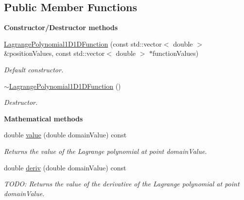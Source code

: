 \subsection*{Public Member Functions}
\begin{Indent}{\bf Constructor/\-Destructor methods}\par
\begin{DoxyCompactItemize}
\item 
\hyperlink{class_q_u_e_s_o_1_1_lagrange_polynomial1_d1_d_function_ab8678ebfde2a4b2ca59741673eeaf103}{Lagrange\-Polynomial1\-D1\-D\-Function} (const std\-::vector$<$ double $>$ \&position\-Values, const std\-::vector$<$ double $>$ $\ast$function\-Values)
\begin{DoxyCompactList}\small\item\em Default constructor. \end{DoxyCompactList}\item 
\hyperlink{class_q_u_e_s_o_1_1_lagrange_polynomial1_d1_d_function_aa1b9170d2f09c55c85fb093644da4246}{$\sim$\-Lagrange\-Polynomial1\-D1\-D\-Function} ()
\begin{DoxyCompactList}\small\item\em Destructor. \end{DoxyCompactList}\end{DoxyCompactItemize}
\end{Indent}
\begin{Indent}{\bf Mathematical methods}\par
\begin{DoxyCompactItemize}
\item 
double \hyperlink{class_q_u_e_s_o_1_1_lagrange_polynomial1_d1_d_function_ada2741739cc9ff0fe98bb51e690df072}{value} (double domain\-Value) const 
\begin{DoxyCompactList}\small\item\em Returns the value of the Lagrange polynomial at point {\ttfamily domain\-Value}. \end{DoxyCompactList}\item 
double \hyperlink{class_q_u_e_s_o_1_1_lagrange_polynomial1_d1_d_function_a202ba706747ba35cf699799fbc3dbb8b}{deriv} (double domain\-Value) const 
\begin{DoxyCompactList}\small\item\em T\-O\-D\-O\-: Returns the value of the derivative of the Lagrange polynomial at point {\ttfamily domain\-Value}. \end{DoxyCompactList}\end{DoxyCompactItemize}
\end{Indent}
